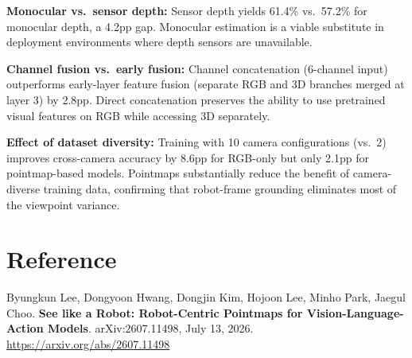 \documentclass[10pt,twocolumn]{article}
\begin{document}
\textbf{Monocular vs.\ sensor depth:} Sensor depth yields 61.4\%
vs.\ 57.2\% for monocular depth, a 4.2pp gap. Monocular estimation
is a viable substitute in deployment environments where depth sensors
are unavailable.

\textbf{Channel fusion vs.\ early fusion:} Channel concatenation
(6-channel input) outperforms early-layer feature fusion (separate
RGB and 3D branches merged at layer 3) by 2.8pp. Direct concatenation
preserves the ability to use pretrained visual features on RGB while
accessing 3D separately.

\textbf{Effect of dataset diversity:} Training with 10 camera
configurations (vs.\ 2) improves cross-camera accuracy by 8.6pp
for RGB-only but only 2.1pp for pointmap-based models. Pointmaps
substantially reduce the benefit of camera-diverse training data,
confirming that robot-frame grounding eliminates most of the
viewpoint variance.

\section*{Reference}

Byungkun Lee, Dongyoon Hwang, Dongjin Kim, Hojoon Lee, Minho Park,
Jaegul Choo.
\textbf{See like a Robot: Robot-Centric Pointmaps for Vision-Language-Action Models}.
arXiv:2607.11498, July 13, 2026.
\url{https://arxiv.org/abs/2607.11498}
\end{document}

